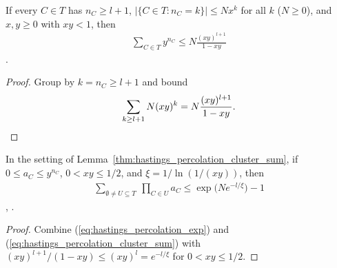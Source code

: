 \begin{lemma}
    \label{thm:hastings_percolation_cluster_sum}
    \leanok
    If every $C\in T$ has $n_C\ge l+1$, $|\{C\in T:n_C=k\}|\le Nx^k$ for all
    $k$ ($N\ge0$), and $x,y\ge0$ with $xy<1$, then
    \begin{align}
        \sum_{C\in T}y^{n_C}
        \le N\frac{(xy)^{l+1}}{1-xy}
        \label{eq:hastings_percolation_cluster_sum}
    \end{align}
    \cite[lines 1238--1241]{Hastings2006Solving}.
\end{lemma}
\begin{proof}
    \leanok
    Group by $k=n_C\ge l+1$ and bound
    \begin{align}
        \sum_{k\ge l+1}N(xy)^k=N\frac{(xy)^{l+1}}{1-xy}.
        \notag
    \end{align}
\end{proof}

\begin{lemma}
    \label{thm:hastings_percolation}
    \leanok
    In the setting of Lemma~\ref{thm:hastings_percolation_cluster_sum}, if
    $0\le a_C\le y^{n_C}$, $0<xy\le1/2$, and $\xi=1/\ln(1/(xy))$, then
    \begin{align}
        \sum_{\emptyset\ne U\subseteq T}\ \prod_{C\in U}a_C
        \le\exp\bigl(Ne^{-l/\xi}\bigr)-1
        \label{eq:hastings_percolation}
    \end{align}
    \cite[eq.~(perc2), lines 1227--1254]{Hastings2006Solving},
    \cite{gap:hastings05_percolation_cluster_size}.
\end{lemma}
\begin{proof}
    \leanok
    Combine (\ref{eq:hastings_percolation_exp}) and
    (\ref{eq:hastings_percolation_cluster_sum}) with
    $(xy)^{l+1}/(1-xy)\le(xy)^l=e^{-l/\xi}$ for $0<xy\le1/2$.
\end{proof}

